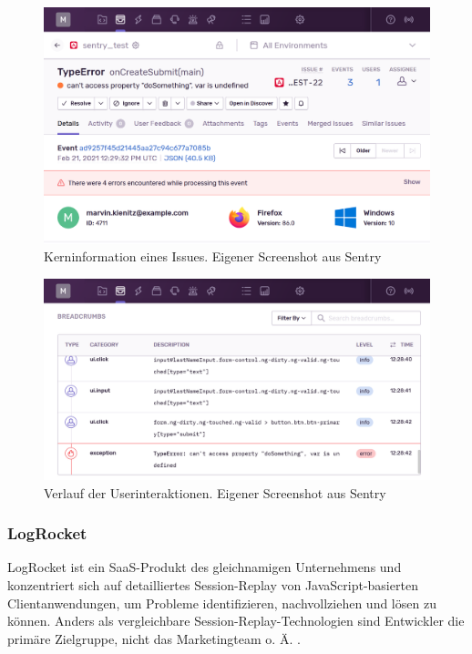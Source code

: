 \begin{figure}[H]
	\centering
	\includegraphics[width=1.00\linewidth]{img/03_methoden/sentry_issue-details.png}
	\caption{Kerninformation eines Issues. Eigener Screenshot aus Sentry}
	\label{fig:sentry_issue-details}
\end{figure}

\begin{figure}[H]
	\centering
	\includegraphics[width=1.00\linewidth]{img/03_methoden/sentry_issue-event-breadcrumbs.png}
	\caption{Verlauf der Userinteraktionen. Eigener Screenshot aus Sentry}
	\label{fig:sentry_issue-event-breadcrumbs}
\end{figure}

\subsubsection{LogRocket}
\label{subsec:logrocket}

LogRocket \cite{LogRocket} ist ein SaaS-Produkt des gleichnamigen Unternehmens und konzentriert sich auf detailliertes Session-Replay von JavaScript-basierten Clientanwendungen, um Probleme identifizieren, nachvollziehen und lösen zu können. Anders als vergleichbare Session-Replay-Technologien sind Entwickler die primäre Zielgruppe, nicht das Marketingteam o. Ä. \cite{Webalyt}.


